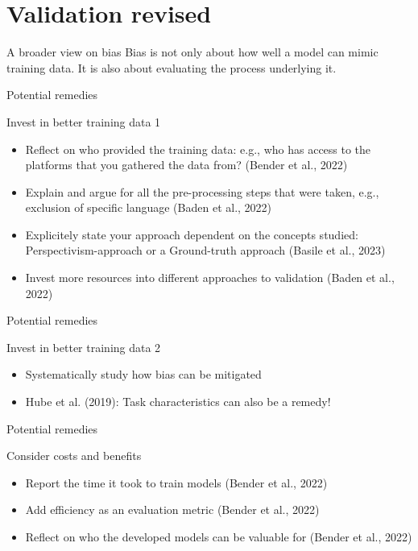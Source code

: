 \documentclass[compress]{beamer}
\begin{document}
\section{Validation revised}

\begin{frame}[fragile]{A broader view on bias} 	
Bias is not only about how well a model can mimic training data. It is also about evaluating the process underlying it.
\end{frame}

\begin{frame}[fragile]{Potential remedies} 	
	\begin{alertblock}{Invest in better training data 1}
		\begin{itemize}
			\item Reflect on who provided the training data: e.g., who has access to the platforms that you gathered the data from? (Bender et al., 2022)
			\item Explain and argue for all the pre-processing steps that were taken, e.g., exclusion of specific language (Baden et al., 2022)
			\item Explicitely state your approach dependent on the concepts studied: Perspectivism-approach or a Ground-truth approach (Basile et al., 2023)
			\item Invest more resources into different approaches to validation (Baden et al., 2022)
		\end{itemize}
	\end{alertblock}
\end{frame}

\begin{frame}[fragile]{Potential remedies} 	
	\begin{alertblock}{Invest in better training data 2}
		\begin{itemize}
			\item Systematically study how bias can be mitigated
			\item Hube et al. (2019): Task characteristics can also be a remedy!
		\end{itemize}
	\end{alertblock}
\end{frame}


\begin{frame}[fragile]{Potential remedies} 	
	\begin{alertblock}{Consider costs and benefits}
		\begin{itemize}
			\item Report the time it took to train models (Bender et al., 2022)
			\item Add efficiency as an evaluation metric (Bender et al., 2022)
			\item Reflect on who the developed models can be valuable for (Bender et al., 2022)
		\end{itemize}
	\end{alertblock}
\end{frame}
\end{document}
